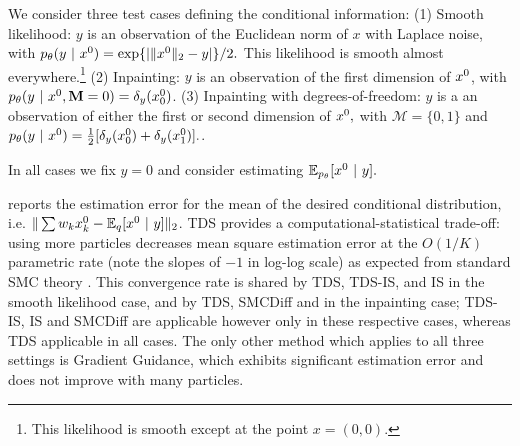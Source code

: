 We consider three test cases defining the conditional information: 
(1)  Smooth likelihood: $y$ is an observation of the Euclidean norm of $x$ with Laplace noise, with $p_{\theta}(y~\vert~ x^{0})=\exp\{| \|x^{0} \|_2 - y|\} / 2 .$  This likelihood is smooth almost everywhere.\footnote{This likelihood is smooth except at the point $x=(0, 0)$.}
    (2) Inpainting:  $y$ is an observation of  the first dimension of $x^{0}$, with $p_{\theta}(y~\vert~ x^{0}, \mathbf{M}=0) = \delta_{y}(x^{0}_0)$.  
    (3) Inpainting with degrees-of-freedom: $y$ is a an observation of either the first or second dimension of $x^{0},$ with $\mathcal{M}=\{0, 1\}$ and $p_{\theta}(y ~\vert~ x^{0}) = \frac{1}{2}[\delta_y(x^{0}_0)+\delta_y(x^{0}_1)].$. 

In all cases we fix $y=0$ and consider estimating $\mathbb{E}_{p_{\theta}}[x^{0}~\vert~ y].$


 reports the estimation error for the mean of the  desired conditional distribution, i.e. $\|\sum w_k x^{0}_k  - \mathbb{E}_q[x^{0} ~\vert~ y ] \|_2$.
TDS provides a computational-statistical trade-off:
using more particles decreases mean square estimation error at the $O(1/K)$ parametric rate
(note the slopes of $-1$ in log-log scale) as expected from standard SMC theory \citep[Ch. 11]{chopin2020introduction}.
This convergence rate is shared by TDS, TDS-IS, and IS in the smooth likelihood case,
and by TDS, SMCDiff and in the inpainting case;
TDS-IS, IS and SMCDiff are applicable however only in these respective cases, 
whereas TDS applicable in all cases.
The only other method which applies to all three settings is Gradient Guidance, which exhibits significant estimation error and does not improve with many particles.




